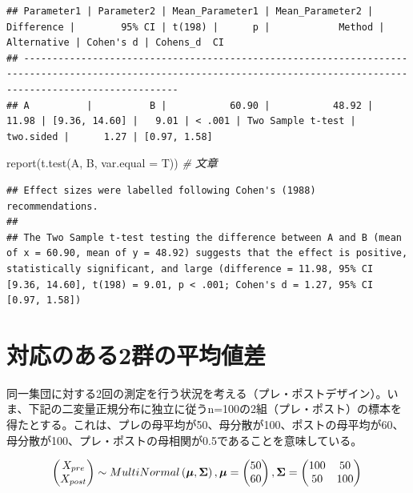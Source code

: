 \documentclass[
  ja=standard, xelatex, base=12pt]{bxjsreport}
\newenvironment{Shaded}{\begin{snugshade}}{\end{snugshade}}
\newcommand{\AttributeTok}[1]{\textcolor[rgb]{0.77,0.63,0.00}{#1}}
\newcommand{\CommentTok}[1]{\textcolor[rgb]{0.56,0.35,0.01}{\textit{#1}}}
\newcommand{\FunctionTok}[1]{\textcolor[rgb]{0.00,0.00,0.00}{#1}}
\newcommand{\NormalTok}[1]{#1}
\begin{document}
\begin{verbatim}
## Parameter1 | Parameter2 | Mean_Parameter1 | Mean_Parameter2 | Difference |        95% CI | t(198) |      p |            Method | Alternative | Cohen's d | Cohens_d  CI
## -----------------------------------------------------------------------------------------------------------------------------------------------------------------------
## A          |          B |           60.90 |           48.92 |      11.98 | [9.36, 14.60] |   9.01 | < .001 | Two Sample t-test |   two.sided |      1.27 | [0.97, 1.58]
\end{verbatim}

\begin{Shaded}
\begin{Highlighting}[]
\FunctionTok{report}\NormalTok{(}\FunctionTok{t.test}\NormalTok{(A, B, }\AttributeTok{var.equal =}\NormalTok{ T)) }\CommentTok{\# 文章}
\end{Highlighting}
\end{Shaded}

\begin{verbatim}
## Effect sizes were labelled following Cohen's (1988) recommendations.
## 
## The Two Sample t-test testing the difference between A and B (mean of x = 60.90, mean of y = 48.92) suggests that the effect is positive, statistically significant, and large (difference = 11.98, 95% CI [9.36, 14.60], t(198) = 9.01, p < .001; Cohen's d = 1.27, 95% CI [0.97, 1.58])
\end{verbatim}

\hypertarget{ux5bfeux5fdcux306eux3042ux308b2ux7fa4ux306eux5e73ux5747ux5024ux5dee-1}{%
\section{対応のある2群の平均値差}\label{ux5bfeux5fdcux306eux3042ux308b2ux7fa4ux306eux5e73ux5747ux5024ux5dee-1}}

同一集団に対する2回の測定を行う状況を考える（プレ・ポストデザイン）。いま、下記の二変量正規分布に独立に従うn=100の2組（プレ・ポスト）の標本を得たとする。これは、プレの母平均が50、母分散が100、ポストの母平均が60、母分散が100、プレ・ポストの母相関が0.5であることを意味している。

\[
\begin{pmatrix} X_{pre} \\ X_{post} \end{pmatrix} \sim MultiNormal \left( \boldsymbol{\mu}, \boldsymbol{\Sigma} \right),\\
\boldsymbol{\mu} = \begin{pmatrix} 50 \\ 60 \end{pmatrix}, 
\boldsymbol{\Sigma} = \begin{pmatrix} 100 & 50 \\ 
50 & 100 \end{pmatrix}\\
\]
\end{document}
